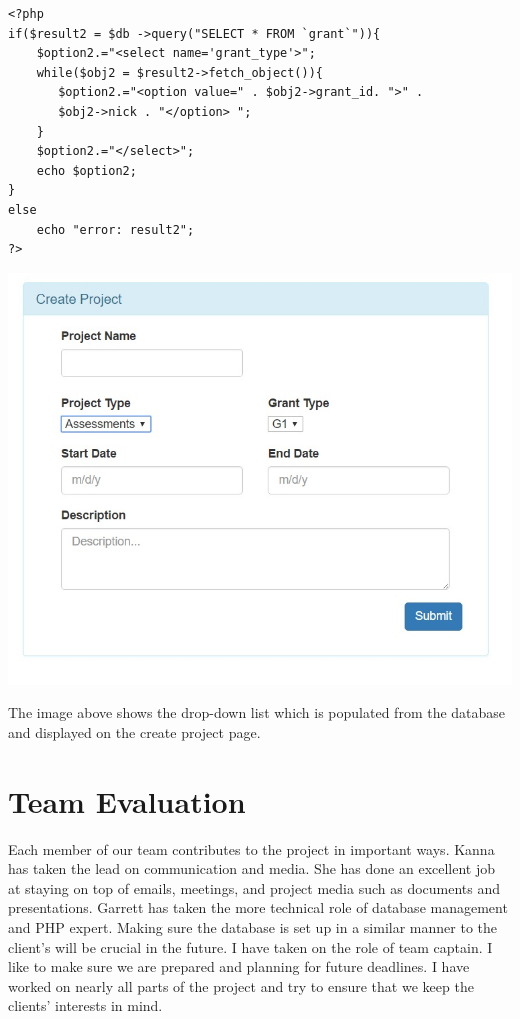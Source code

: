 \documentclass[letterpaper,10pt,titlepage,journal,compsoc,draftclsnofoot,onecolumn]{IEEEtran}
\newcommand\tab[1][1cm]{\hspace*{#1}}
\begin{document}
\lstset{language=PHP, showstringspaces=false}
\begin{lstlisting}
<?php
if($result2 = $db ->query("SELECT * FROM `grant`")){
	$option2.="<select name='grant_type'>";
	while($obj2 = $result2->fetch_object()){
	   $option2.="<option value=" . $obj2->grant_id. ">" . 
	   $obj2->nick . "</option> ";
	}
	$option2.="</select>"; 
	echo $option2;
}
else
	echo "error: result2";
?>

\end{lstlisting}

\includegraphics[scale=0.75]{dropdown} 


The image above shows the drop-down list which is populated from the database and displayed on the create project page.
\newline

\section{Team Evaluation}

\tab
Each member of our team contributes to the project in important ways. Kanna has taken the lead on communication and media. She has done an excellent job at staying on top of emails, meetings, and project media such as documents and presentations. Garrett has taken the more technical role of database management and PHP expert. Making sure the database is set up in a similar manner to the client’s will be crucial in the future. I have taken on the role of team captain. I like to make sure we are prepared and planning for future deadlines. I have worked on nearly all parts of the project and try to ensure that we keep the clients’ interests in mind.
\newline
\end{document}
